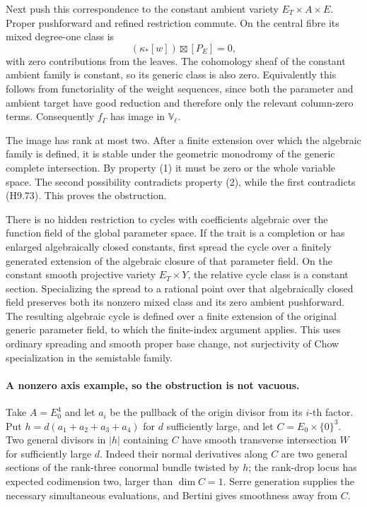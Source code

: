 Next push this correspondence to the constant ambient variety
$E_T\times A\times E$. Proper pushforward and refined restriction
commute. On the central fibre its mixed degree-one class is
\[
             (\kappa_*[w])\boxtimes[P_E]=0,                 \tag{H9.74}
\]
with zero contributions from the leaves. The cohomology sheaf of
the constant ambient family is constant, so its generic class is
also zero. Equivalently this follows from functoriality of the
weight sequences, since both the parameter and ambient target
have good reduction and therefore only the relevant column-zero
terms. Consequently $f_\Gamma$ has image in $\mathbb V_\ell$.

The image has rank at most two. After a finite extension over which
the algebraic family is defined, it is stable under the geometric
monodromy of the generic complete intersection. By property (1) it
must be zero or the whole variable space. The second possibility
contradicts property (2), while the first contradicts (H9.73).
This proves the obstruction.

There is no hidden restriction to cycles with coefficients algebraic
over the function field of the global parameter space. If the
trait is a completion or has enlarged algebraically closed constants,
first spread the cycle over a finitely generated extension of the
algebraic closure of that parameter field. On the constant smooth
projective variety $E_T\times Y$, the relative cycle class is a
constant section. Specializing the spread to a rational point over
that algebraically closed field preserves both its nonzero mixed
class and its zero ambient pushforward. The resulting algebraic
cycle is defined over a finite extension of the original generic
parameter field, to which the finite-index argument applies.
This uses ordinary spreading and smooth proper base change, not
surjectivity of Chow specialization in the semistable family.

\paragraph{A nonzero axis example, so the obstruction is not vacuous.}
Take $A=E_0^4$ and let $a_i$ be the pullback of the origin divisor
from its $i$-th factor. Put $h=d(a_1+a_2+a_3+a_4)$ for $d$ sufficiently
large, and let
$C=E_0\times\{0\}^3$. Two general divisors in $|h|$ containing
$C$ have smooth transverse intersection $W$ for sufficiently large
$d$. Indeed their normal derivatives along $C$ are two general
sections of the rank-three conormal bundle twisted by $h$; the
rank-drop locus has expected codimension two, larger than
$\dim C=1$. Serre generation supplies the necessary simultaneous
evaluations, and Bertini gives smoothness away from $C$.

